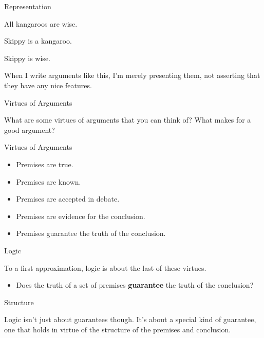 \documentclass[
  ignorenonframetext,
]{beamer}
\providecommand{\tightlist}{%
  \setlength{\itemsep}{0pt}\setlength{\parskip}{0pt}}
\renewcommand{\,}{\text{, }}
\renewenvironment*{quote}	
	{\list{}{\rightmargin   \leftmargin} \item } 	
	{\endlist }
\newcommand{\DisplayArg}[2]{
\begin{enumerate}
{#1}
\end{enumerate}
\vspace{-6pt}
\hrulefill

\begin{quote}
{\normalfont #2}
\end{quote}
\vspace{12pt}
}
\begin{document}
\begin{frame}{Representation}
\protect\hypertarget{representation}{}

\DisplayArg{ \item All kangaroos are wise. \item Skippy is a kangaroo. } { Skippy is wise. }

When I write arguments like this, I'm merely presenting them, not
asserting that they have any nice features.

\end{frame}

\begin{frame}{Virtues of Arguments}
\protect\hypertarget{virtues-of-arguments}{}

What are some virtues of arguments that you can think of? What makes for
a good argument?

\end{frame}

\begin{frame}{Virtues of Arguments}
\protect\hypertarget{virtues-of-arguments-1}{}

\begin{itemize}[<+->]
\tightlist
\item
  Premises are true.
\item
  Premises are known.
\item
  Premises are accepted in debate.
\item
  Premises are evidence for the conclusion.
\item
  Premises guarantee the truth of the conclusion.
\end{itemize}

\end{frame}

\begin{frame}{Logic}
\protect\hypertarget{logic}{}

To a first approximation, logic is about the last of these virtues.

\begin{itemize}
\tightlist
\item
  Does the truth of a set of premises \textbf{guarantee} the truth of
  the conclusion?
\end{itemize}

\end{frame}

\begin{frame}{Structure}
\protect\hypertarget{structure}{}

Logic isn't just about guarantees though. It's about a special kind of
guarantee, one that holds in virtue of the structure of the premises and
conclusion.

\end{frame}
\end{document}
